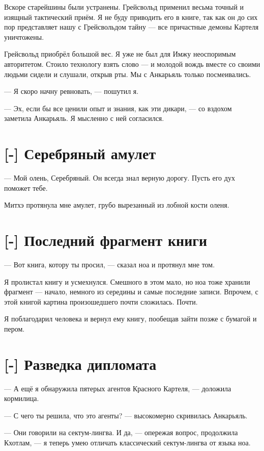 Вскоре старейшины были устранены.
Грейсвольд применил весьма точный и изящный тактический приём.
Я не буду приводить его в книге, так как он до сих пор представляет нашу с Грейсвольдом тайну --- все причастные демоны Картеля уничтожены.

Грейсвольд приобрёл большой вес.
Я уже не был для Имжу неоспоримым авторитетом.
Стоило технологу взять слово --- и молодой вождь вместе со своими людьми сидели и слушали, открыв рты.
Мы с Анкарьяль только посмеивались.

--- Я скоро начну ревновать, --- пошутил я.

--- Эх, если бы все ценили опыт и знания, как эти дикари, --- со вздохом заметила Анкарьяль.
Я мысленно с ней согласился.

\textspace

\section{[-] Серебряный амулет}

--- Мой олень, Серебряный.
Он всегда знал верную дорогу.
Пусть его дух поможет тебе.

Митхэ протянула мне амулет, грубо вырезанный из лобной кости оленя.

\section{[-] Последний фрагмент книги}

--- Вот книга, котору ты просил, --- сказал ноа и протянул мне том.

Я пролистал книгу и усмехнулся.
Смешного в этом мало, но ноа тоже хранили фрагмент --- начало, немного из середины и самые последние записи.
Впрочем, с этой книгой картина произошедшего почти сложилась.
Почти.

Я поблагодарил человека и вернул ему книгу, пообещав зайти позже с бумагой и пером.

\section{[-] Разведка дипломата}

--- А ещё я обнаружила пятерых агентов Красного Картеля, --- доложила кормилица.

--- С чего ты решила, что это агенты? --- высокомерно скривилась Анкарьяль.

--- Они говорили на сектум-лингва.
И да, --- опережая вопрос, продолжила Кхотлам, --- я теперь умею отличать классический сектум-лингва от языка ноа.

